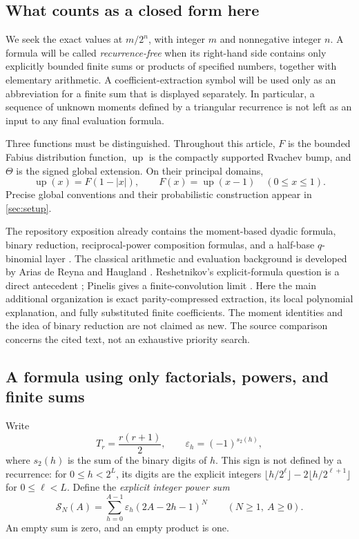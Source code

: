 \documentclass[11pt,a4paper]{article}
\numberwithin{equation}{section}
\theoremstyle{definition}
\theoremstyle{remark}
\newcommand{\up}{\operatorname{up}}
\newcommand{\eps}{\varepsilon}
\newcommand{\bits}{s_2}
\begin{document}
\subsection{What counts as a closed form here}
We seek the exact values at $m/2^n$, with integer $m$ and nonnegative integer $n$. A formula will be called \emph{recurrence-free} when its right-hand side contains only explicitly bounded finite sums or products of specified numbers, together with elementary arithmetic. A coefficient-extraction symbol will be used only as an abbreviation for a finite sum that is displayed separately. In particular, a sequence of unknown moments defined by a triangular recurrence is not left as an input to any final evaluation formula.

Three functions must be distinguished. Throughout this article, $F$ is the bounded Fabius distribution function, $\up$ is the compactly supported Rvachev bump, and $\Theta$ is the signed global extension. On their principal domains,
\begin{equation}
 \up(x)=F(1-|x|),\qquad F(x)=\up(x-1)\quad(0\le x\le1).
 \label{eq:fold-intro}
\end{equation}
Precise global conventions and their probabilistic construction appear in \cref{sec:setup}.

The repository exposition already contains the moment-based dyadic formula, binary reduction, reciprocal-power composition formulas, and a half-base $q$-binomial layer \cite{repo}. The classical arithmetic and evaluation background is developed by Arias de Reyna and Haugland \cite{arias2018,haugland}. Reshetnikov's explicit-formula question is a direct antecedent \cite{reshetnikov}; Pinelis gives a finite-convolution limit \cite{pinelis}. Here the main additional organization is exact parity-compressed extraction, its local polynomial explanation, and fully substituted finite coefficients. The moment identities and the idea of binary reduction are not claimed as new. The source comparison concerns the cited text, not an exhaustive priority search.

\subsection{A formula using only factorials, powers, and finite sums}
Write
\begin{equation}
 T_r=\frac{r(r+1)}2,\qquad \eps_h=(-1)^{\bits(h)},
 \label{eq:basic-notation}
\end{equation}
where $\bits(h)$ is the sum of the binary digits of $h$. This sign is not defined by a recurrence: for $0\le h<2^L$, its digits are the explicit integers $\lfloor h/2^\ell\rfloor-2\lfloor h/2^{\ell+1}\rfloor$ for $0\le\ell<L$. Define the \emph{explicit integer power sum}
\begin{equation}
 \mathcal S_N(A)=\sum_{h=0}^{A-1}\eps_h(2A-2h-1)^N
 \qquad(N\ge1,\ A\ge0).
 \label{eq:integer-power-sum}
\end{equation}
An empty sum is zero, and an empty product is one.
\end{document}
